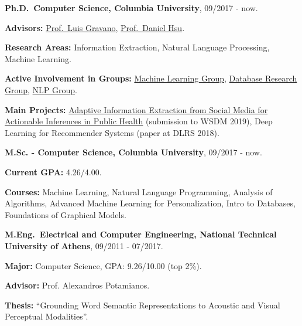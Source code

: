 \documentclass[letterpaper]{article}
\renewenvironment{itemize}{
  \begin{list}{}{
    \setlength{\leftmargin}{1.5em}
  }
}{
  \end{list}
}
\begin{document}
\begin{itemize}
  \item
    \textbf{Ph.D.~Computer Science, Columbia University}, 
     09/2017 - now.
     \begin{itemize}
         \item     
         \textbf{Advisors:} \href{http://www.cs.columbia.edu/~gravano/}{Prof.~Luis Gravano}, \href{http://www.cs.columbia.edu/~djhsu/}{Prof.~Daniel Hsu}.
         \item 
         \textbf{Research Areas:} Information Extraction, Natural Language Processing, Machine Learning.
        \item 
            \textbf{Active Involvement in Groups:} %
             \href{http://www.cs.columbia.edu/areas/machine/}{Machine Learning Group}, \href{https://cudbg.github.io/}{Database Research Group}, \href{http://www.cs.columbia.edu/nlp/index.cgi}{NLP Group}.
        \item 
            \textbf{Main Projects:} \href{http://publichealth.cs.columbia.edu/}{Adaptive Information Extraction from Social Media for Actionable Inferences in Public Health} (submission to WSDM 2019), Deep Learning for Recommender Systems (paper at DLRS 2018). 

     \end{itemize}
     
    \item 
        \textbf{M.Sc. - Computer Science, Columbia University}, 09/2017 - now.
        \begin{itemize}
            \item \textbf{Current GPA:} 4.26/4.00.
            \item \textbf{Courses:} Machine Learning, Natural Language Programming, Analysis of Algorithms, Advanced Machine Learning for Personalization, Intro to Databases, Foundations of Graphical Models. 

        \end{itemize}
  \item
    \textbf{M.Eng.~Electrical and Computer Engineering, National Technical University of Athens},
    09/2011 - 07/2017.
    \begin{itemize}
        \item \textbf{Major:} Computer Science, GPA: 9.26/10.00 (top 2\%).
        \item \textbf{Advisor:} Prof. Alexandros Potamianos.
        \item \textbf{Thesis:} ``Grounding Word Semantic Representations to Acoustic and Visual Perceptual Modalities''.
    \end{itemize}



\end{itemize}
\end{document}
